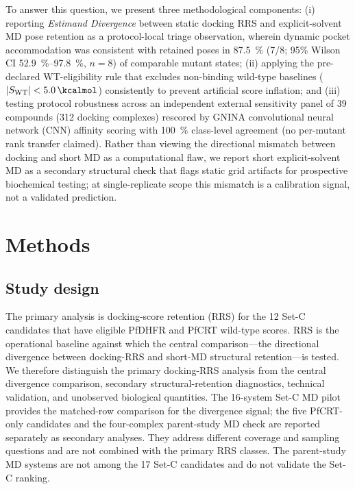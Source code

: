 \documentclass[journal=jcisd8,manuscript=article,layout=traditional]{achemso}
\begin{document}
To answer this question, we present three methodological components: (i) reporting \textit{Estimand Divergence} between static docking RRS and explicit-solvent MD pose retention as a protocol-local triage observation, wherein dynamic pocket accommodation was consistent with retained poses in \qty{87.5}{\percent} (7/8; 95\% Wilson CI \qtyrange{52.9}{97.8}{\percent}, $n=\num{8}$) of comparable mutant states; (ii) applying the pre-declared WT-eligibility rule that excludes non-binding wild-type baselines ($|S_{\mathrm{WT}}| < \qty{5.0}{\kcalmol}$) consistently to prevent artificial score inflation; and (iii) testing protocol robustness across an independent external sensitivity panel of 39 compounds (\num{312} docking complexes) rescored by GNINA convolutional neural network (CNN) affinity scoring with \qty{100}{\percent} class-level agreement (no per-mutant rank transfer claimed). Rather than viewing the directional mismatch between docking and short MD as a computational flaw, we report short explicit-solvent MD as a secondary structural check that flags static grid artifacts for prospective biochemical testing; at single-replicate scope this mismatch is a calibration signal, not a validated prediction.


\section{Methods}

\subsection{Study design}

The primary analysis is docking-score retention (RRS) for the 12 Set-C candidates that have eligible PfDHFR and PfCRT wild-type scores. RRS is the operational baseline against which the central comparison---the directional divergence between docking-RRS and short-MD structural retention---is tested. We therefore distinguish the primary docking-RRS analysis from the central divergence comparison, secondary structural-retention diagnostics, technical validation, and unobserved biological quantities. The 16-system Set-C MD pilot provides the matched-row comparison for the divergence signal; the five PfCRT-only candidates and the four-complex parent-study MD check are reported separately as secondary analyses. They address different coverage and sampling questions and are not combined with the primary RRS classes. The parent-study MD systems are not among the 17 Set-C candidates and do not validate the Set-C ranking.
\end{document}
